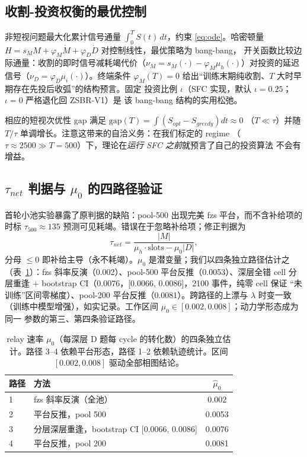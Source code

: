 \documentclass[11pt]{article}
\theoremstyle{definition}
\begin{document}
\subsection{收割-投资权衡的最优控制}\label{sec:l3-control}
非短视问题最大化累计信号通量 $\int_0^T S(t)\,dt$，约束 \eqref{eq:ode}。哈密顿量
$H = s_M M + \varphi_M \dot M + \varphi_D \dot D$ 对控制线性，最优策略为 bang-bang，
开关函数比较边际通量：收割的即时信号减耗竭代价（$\nu_M = s_M(\cdot) -
\varphi_M\mu_h(\cdot)$）对投资的延迟信号（$\nu_D = \varphi_D\mu_i(\cdot)$）。终端条件
$\varphi_M(T){=}0$ 给出“训练末期纯收割、$T$ 大时早期存在先投后收弧”的结构预言。固定
投资比例 $\iota$（SFC 实现，默认 $\iota{=}0.25$；$\iota{=}0$ 严格退化回 ZSBR-V1）是
该 bang-bang 结构的实用松弛。

相应的短视次优性 gap 满足 $\mathrm{gap}(T)=\int(S_{opt}-S_{greedy})dt \approx 0$
（$T\ll\tau$）并随 $T/\tau$ 单调增长。注意这带来的自洽义务：在我们标定的 regime
（$\tau\approx2500\gg T{=}500$）下，理论在\emph{运行 SFC 之前}就预言了自己的投资算法
不会有增益。

\subsection{$\tau_{net}$ 判据与 $\mu_0$ 的四路径验证}\label{sec:l3-tau}
首轮小池实验暴露了原判据的缺陷：pool-500 出现完美 fzs 平台，而不含补给项的时标
$\tau_{500}\approx135$ 预测可见耗竭。错误在于忽略补给项；修正判据为
\begin{equation}\label{eq:taunet}
\tau_{net} = \frac{|M|}{\mu_h\cdot\text{slots} - \mu_0 |D|},
\end{equation}
分母 $\le0$ 即补给主导（永不耗竭）。$\mu_0$ 是潜变量；我们以四条独立路径估计之
（表~\ref{tab:mu0}）：fzs 斜率反演（0.002）、pool-500 平台反推（0.0053）、深层全错
cell 分层重逢 + bootstrap CI（0.0076，[0.0066, 0.0086]，2100 事件，纯零 cell 保证
“未训练”区间零梯度）、pool-200 平台反推（0.0081）。跨路径的上漂与 $\lambda$ 时变一致
（训练中模型增强），如实记录。工作区间 $\mu_0\in[0.002,0.008]$；动力学形态成为同一
参数的第三、第四条验证路径。

\begin{table}[t]
\centering\small
\caption{relay 速率 $\mu_0$（每深层 D 题每 cycle 的转化数）的四条独立估计。路径
3--4 依赖平台形态，路径 1--2 依赖轨迹统计。区间 $[0.002,0.008]$ 驱动全部相图结论。}
\label{tab:mu0}
\begin{tabular}{@{}llc@{}}
\toprule
路径 & 方法 & $\hat\mu_0$ \\
\midrule
1 & fzs 斜率反演（全池） & 0.002 \\
2 & 平台反推，pool 500 & 0.0053 \\
3 & 分层深层重逢，bootstrap CI [0.0066, 0.0086] & 0.0076 \\
4 & 平台反推，pool 200 & 0.0081 \\
\bottomrule
\end{tabular}
\end{table}
\end{document}
